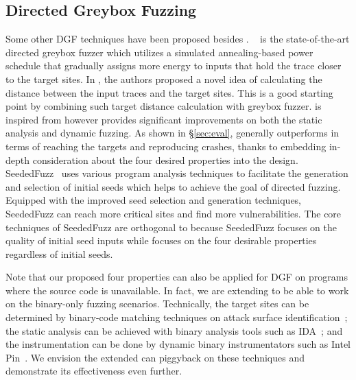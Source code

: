 \subsection{Directed Greybox Fuzzing}
Some other DGF techniques have been proposed besides \dFOT.
\aflgo~\cite{Bohme:2017:DGF} is the state-of-the-art directed greybox fuzzer which utilizes a simulated annealing-based power schedule that gradually assigns more energy to inputs that hold the trace closer to the target sites.
In \aflgo, the authors proposed a novel idea of calculating the distance between the input traces and the target sites.
This is a good starting point by combining such target distance calculation with greybox fuzzer.
\dFOT is inspired from \aflgo however provides significant improvements on both the static analysis and dynamic fuzzing.
As shown in \S\ref{sec:eval}, \dFOT generally outperforms \aflgo in terms of reaching the targets and reproducing crashes, thanks to embedding in-depth consideration about the four desired properties into the design.
SeededFuzz~\cite{tase16:seededfuzz} uses various program analysis techniques to facilitate the generation and selection of initial seeds which helps to achieve the goal of directed fuzzing.
Equipped with the improved seed selection and generation techniques, SeededFuzz can reach more critical sites and find more vulnerabilities.
The core techniques of SeededFuzz are orthogonal to \dFOT because SeededFuzz focuses on the quality of initial seed inputs while \dFOT focuses on the four desirable properties regardless of initial seeds.

Note that our proposed four properties can also be applied for DGF on programs where the source code is unavailable. In fact, we are extending {\dFOT} to be able to work on the binary-only fuzzing scenarios. Technically, the target sites can be determined by binary-code matching techniques on attack surface identification~\cite{bingo,tse18}; the static analysis can be achieved with binary analysis tools such as IDA~\cite{ida}; and the instrumentation can be done by dynamic binary instrumentators such as Intel Pin~\cite{pin}. We envision the extended {\dFOT} can piggyback on these techniques and demonstrate its effectiveness even further.


